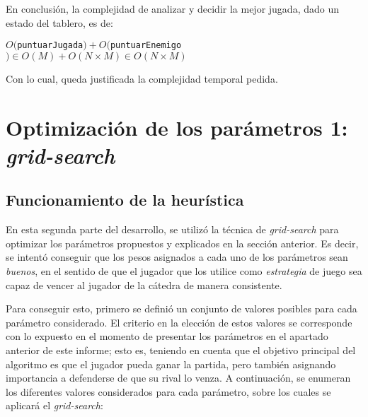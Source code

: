 \documentclass[12pt,a4paper]{article}
\begin{document}
    En conclusión, la complejidad de analizar y decidir la mejor jugada, dado un estado del tablero, es de:
    
    \begin{center}
        $O($\texttt{puntuarJugada}$) + O($\texttt{puntuarEnemigo}$) \in O(M) + O(N \times M) \in O(N \times M)$
    \end{center}
    
    Con lo cual, queda justificada la complejidad temporal pedida.
    
    

\newpage



\section{Optimización de los parámetros 1: \textit{grid-search}}

    \subsection{Funcionamiento de la heurística}
    En esta segunda parte del desarrollo, se utilizó la técnica de \textit{grid-search} para optimizar los parámetros propuestos y explicados en la sección anterior. Es decir, se intentó conseguir que los pesos asignados a cada uno de los parámetros sean \textit{buenos}, en el sentido de que el jugador que los utilice como \textit{estrategia} de juego sea capaz de vencer al jugador de la cátedra de manera consistente.
    
    Para conseguir esto, primero se definió un conjunto de valores posibles para cada parámetro considerado. El criterio en la elección de estos valores se corresponde con lo expuesto en el momento de presentar los parámetros en el apartado anterior de este informe; esto es, teniendo en cuenta que el objetivo principal del algoritmo es que el jugador pueda ganar la partida, pero también asignando importancia a defenderse de que su rival lo venza. A continuación, se enumeran los diferentes valores considerados para cada parámetro, sobre los cuales se aplicará el \textit{grid-search}:
    
\end{document}
